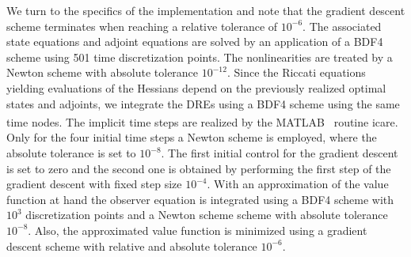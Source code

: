 \documentclass[11pt,reqno]{amsart}
\numberwithin{equation}{section}
\theoremstyle{plain}
\newcommand{\Matlab}{MATLAB\textsuperscript{\textregistered}}
\begin{document}
We turn to the specifics of the implementation and note that the gradient descent scheme terminates when reaching a relative tolerance of $10^{-6}$.
The associated state equations and adjoint equations are solved by an application of a BDF4 scheme using 501 time discretization points. The nonlinearities are treated by a Newton scheme with absolute tolerance $10^{-12}$. Since the Riccati equations yielding evaluations of the Hessians depend on the previously realized optimal states and adjoints, we integrate the DREs using a BDF4 scheme using the same time nodes. The implicit time steps are realized by the \Matlab~ routine icare. Only for the four initial time steps a Newton scheme is employed, where the absolute tolerance is set to $10^{-8}$. The first initial control for the gradient descent is set to zero and the second one is obtained by performing the first step of the gradient descent with fixed step size $10^{-4}$.
With an approximation of the value function at hand the observer equation is integrated using a BDF4 scheme with $10^3$ discretization points and a Newton scheme scheme with absolute tolerance $10^{-8}$. Also, the approximated value function is minimized using a gradient descent scheme with relative and absolute tolerance $10^{-6}$.

%
\end{document}
